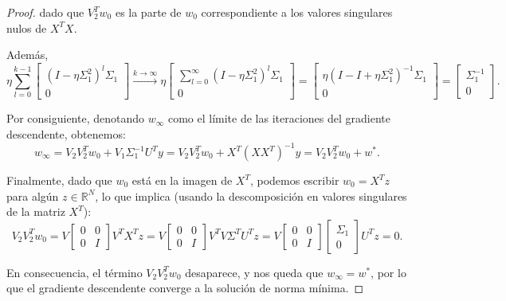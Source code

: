 \begin{proof}
    dado que $V_{2}^{T}w_0$ es la parte de $w_0$ correspondiente a los valores singulares nulos de $X^{T}X$.

    Además,
    \[
        \eta \sum_{l=0}^{k-1} \begin{bmatrix} (I - \eta \Sigma_1^2)^l \Sigma_1 \\ 0 \end{bmatrix}  \xrightarrow{k \to \infty} \eta \begin{bmatrix} \sum_{l=0}^{\infty}(I - \eta \Sigma_1^2)^l \Sigma_1 \\ 0 \end{bmatrix} = \begin{bmatrix} \eta(I - I + \eta \Sigma_1^2)^{-1} \Sigma_1 \\ 0 \end{bmatrix} = \begin{bmatrix} \Sigma_1^{-1} \\ 0 \end{bmatrix}.
    \]

    Por consiguiente, denotando $w_\infty$ como el límite de las iteraciones del gradiente descendente, obtenemos:
    \[
        w_\infty = V_2 V_2^T w_0 + V_1 \Sigma_1^{-1} U^T y = V_2 V_2^T w_0 + X^{T}{(XX^{T})}^{-1}y = V_2 V_2^T w_0 + w^*.
    \]

    Finalmente, dado que $w_0$ está en la imagen de $X^T$, podemos escribir $w_0 = X^T z$ para algún $z \in \mathbb{R}^N $, lo que implica (usando la descomposición en valores singulares de la matriz $X^{T}$):
    \[
        V_2 V_2^T w_0 = V \begin{bmatrix} 0 & 0 \\ 0 & I \end{bmatrix}V^{T}X^{T}z = V \begin{bmatrix} 0 & 0 \\ 0 & I \end{bmatrix}V^{T}V\Sigma^{T}U^{T}z = V \begin{bmatrix} 0 & 0 \\ 0 & I \end{bmatrix}\begin{bmatrix} \Sigma_1 \\ 0 \end{bmatrix}U^{T}z = 0.
    \]

    En consecuencia, el término $V_2 V_2^T w_0$ desaparece, y nos queda que $w_\infty = w^{*}$, por lo que el gradiente descendente converge a la solución de norma mínima.
\end{proof}

